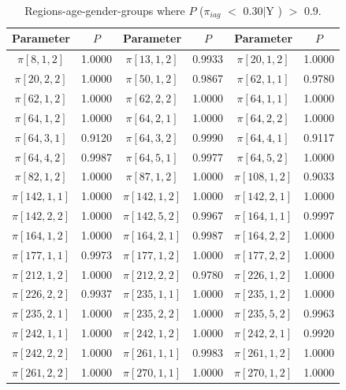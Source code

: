 \documentclass[12pt]{article}
\begin{document}
\begin{table}[h!]
    \centering
    \begin{threeparttable}
        \caption{Regions-age-gender-groups where $P$ ($\pi_{iag}$ $<$ 0.30$|$Y ) $>$ 0.9.}
        \label{tab:posterior_pi2}
        \begin{tabular}{cc|cc|cc}
        \hline
        \textbf{Parameter} & $P$ & \textbf{Parameter} & $P$ & \textbf{Parameter} & $P$ \\ \hline
        $\pi[8,1,2]$ & 1.0000 & $\pi[13,1,2]$ & 0.9933 & $\pi[20,1,2]$ & 1.0000 \\ 
        $\pi[20,2,2]$ & 1.0000 & $\pi[50,1,2]$ & 0.9867 & $\pi[62,1,1]$ & 0.9780 \\ 
        $\pi[62,1,2]$ & 1.0000 & $\pi[62,2,2]$ & 1.0000 & $\pi[64,1,1]$ & 1.0000 \\ 
        $\pi[64,1,2]$ & 1.0000 & $\pi[64,2,1]$ & 1.0000 & $\pi[64,2,2]$ & 1.0000 \\ 
        $\pi[64,3,1]$ & 0.9120 & $\pi[64,3,2]$ & 0.9990 & $\pi[64,4,1]$ & 0.9117 \\ 
        $\pi[64,4,2]$ & 0.9987 & $\pi[64,5,1]$ & 0.9977 & $\pi[64,5,2]$ & 1.0000 \\ 
        $\pi[82,1,2]$ & 1.0000 & $\pi[87,1,2]$ & 1.0000 & $\pi[108,1,2]$ & 0.9033 \\ 
        $\pi[142,1,1]$ & 1.0000 & $\pi[142,1,2]$ & 1.0000 & $\pi[142,2,1]$ & 1.0000 \\ 
        $\pi[142,2,2]$ & 1.0000 & $\pi[142,5,2]$ & 0.9967 & $\pi[164,1,1]$ & 0.9997 \\ 
        $\pi[164,1,2]$ & 1.0000 & $\pi[164,2,1]$ & 0.9987 & $\pi[164,2,2]$ & 1.0000 \\ 
        $\pi[177,1,1]$ & 0.9973 & $\pi[177,1,2]$ & 1.0000 & $\pi[177,2,2]$ & 1.0000 \\ 
        $\pi[212,1,2]$ & 1.0000 & $\pi[212,2,2]$ & 0.9780 & $\pi[226,1,2]$ & 1.0000 \\ 
        $\pi[226,2,2]$ & 0.9937 & $\pi[235,1,1]$ & 1.0000 & $\pi[235,1,2]$ & 1.0000 \\ 
        $\pi[235,2,1]$ & 1.0000 & $\pi[235,2,2]$ & 1.0000 & $\pi[235,5,2]$ & 0.9963 \\ 
        $\pi[242,1,1]$ & 1.0000 & $\pi[242,1,2]$ & 1.0000 & $\pi[242,2,1]$ & 0.9920 \\ 
        $\pi[242,2,2]$ & 1.0000 & $\pi[261,1,1]$ & 0.9983 & $\pi[261,1,2]$ & 1.0000 \\ 
        $\pi[261,2,2]$ & 1.0000 & $\pi[270,1,1]$ & 1.0000 & $\pi[270,1,2]$ & 1.0000 \\ 

\end{tabular}
\end{threeparttable}
\end{table}
\end{document}
